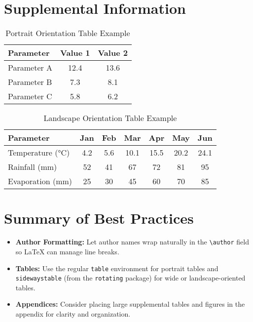 \documentclass[12pt]{article}
\begin{document}
\section{Supplemental Information}

\begin{table}[htbp]
    \centering
    \caption{Portrait Orientation Table Example}
    \begin{tabular}{lcc}
    \toprule
    \textbf{Parameter} & \textbf{Value 1} & \textbf{Value 2} \\
    \midrule
    Parameter A & 12.4 & 13.6 \\
    Parameter B & 7.3 & 8.1 \\
    Parameter C & 5.8 & 6.2 \\
    \bottomrule
    \end{tabular}
    \label{tab:portrait-example}
\end{table}

\begin{sidewaystable}[htbp]
    \centering
    \caption{Landscape Orientation Table Example}
    \begin{tabular}{lcccccc}
    \toprule
    \textbf{Parameter} & \textbf{Jan} & \textbf{Feb} & \textbf{Mar} & \textbf{Apr} & \textbf{May} & \textbf{Jun} \\
    \midrule
    Temperature (°C) & 4.2 & 5.6 & 10.1 & 15.5 & 20.2 & 24.1 \\
    Rainfall (mm)    & 52  & 41  & 67   & 72   & 81   & 95   \\
    Evaporation (mm) & 25  & 30  & 45   & 60   & 70   & 85   \\
    \bottomrule
    \end{tabular}
    \label{tab:landscape-example}
\end{sidewaystable}

\clearpage

\section*{Summary of Best Practices}
\begin{itemize}
    \item \textbf{Author Formatting:} Let author names wrap naturally in the \texttt{\textbackslash author} field so LaTeX can manage line breaks.
    \item \textbf{Tables:} Use the regular \texttt{table} environment for portrait tables and \texttt{sidewaystable} (from the \texttt{rotating} package) for wide or landscape-oriented tables.
    \item \textbf{Appendices:} Consider placing large supplemental tables and figures in the appendix for clarity and organization.
\end{itemize}
\end{document}
